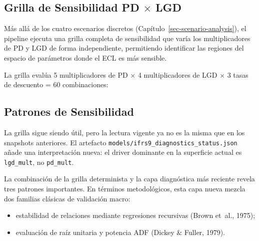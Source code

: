 \documentclass[
  spanish,
  11pt,
  letterpaper,
]{scrbook}
\providecommand{\tightlist}{%
  \setlength{\itemsep}{0pt}\setlength{\parskip}{0pt}}
\theoremstyle{plain}
\theoremstyle{remark}
\begin{document}
\subsection{\texorpdfstring{Grilla de Sensibilidad PD \(\times\)
LGD}{Grilla de Sensibilidad PD \textbackslash times LGD}}\label{grilla-de-sensibilidad-pd-times-lgd}

Más allá de los cuatro escenarios discretos
(Capítulo~\ref{sec-scenario-analysis}), el pipeline ejecuta una grilla
completa de sensibilidad que varía los multiplicadores de PD y LGD de
forma independiente, permitiendo identificar las regiones del espacio de
parámetros donde el ECL es más sensible.

La grilla evalúa 5 multiplicadores de PD \(\times\) 4 multiplicadores de
LGD \(\times\) 3 tasas de descuento = 60 combinaciones:

\begin{table}

\caption{\label{tbl-sensitivity-grid}Grilla de sensibilidad PD x LGD:
ECL total por combinación (tasa 5\%).}


\end{table}%

\subsection{Patrones de Sensibilidad}\label{patrones-de-sensibilidad}

La grilla sigue siendo útil, pero la lectura vigente ya no es la misma
que en los snapshots anteriores. El artefacto
\texttt{models/ifrs9\_diagnostics\_status.json} añade una interpretación
nueva: el driver dominante en la superficie actual es
\texttt{lgd\_mult}, no \texttt{pd\_mult}.

La combinación de la grilla determinista y la capa diagnóstica más
reciente revela tres patrones importantes. En términos metodológicos,
esta capa nueva mezcla dos familias clásicas de validación macro:

\begin{itemize}
\tightlist
\item
  estabilidad de relaciones mediante regresiones recursivas (Brown
  et~al., 1975);
\item
  evaluación de raíz unitaria y potencia ADF (Dickey \& Fuller, 1979).
\end{itemize}
\end{document}

